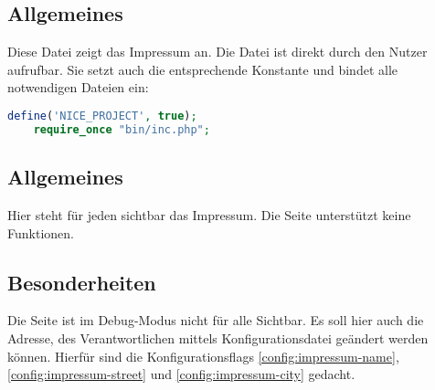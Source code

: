 \subsection{Allgemeines} Diese Datei zeigt das Impressum an.
Die Datei ist direkt durch den Nutzer aufrufbar. Sie setzt auch die entsprechende Konstante und bindet alle notwendigen Dateien ein:
\begin{lstlisting}[language=php]
	define('NICE_PROJECT', true);
	require_once "bin/inc.php";
\end{lstlisting}
\subsection{Allgemeines}
Hier steht für jeden sichtbar das Impressum. Die Seite unterstützt keine Funktionen.
\subsection{Besonderheiten}
Die Seite ist im Debug-Modus nicht für alle Sichtbar. Es soll hier auch die Adresse, des Verantwortlichen mittels Konfigurationsdatei geändert werden können. Hierfür sind die Konfigurationsflags \autoref{config:impressum-name}, \autoref{config:impressum-street} und \autoref{config:impressum-city} gedacht.